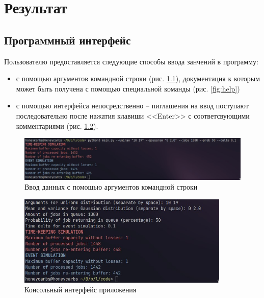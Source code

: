 \chapter{Результат}

%

\section{Программный интерфейс}

Пользователю предоставляется следующие способы ввода занчений в программу:
\begin{itemize}
	\item с помощью аргументов командной строки (рис. \ref{fig:cli}), документация к которым может быть получена с помощью специальной команды (рис. \ref{fig:help})
	\item с помощью интерфейса непосредственно -- пиглашения на ввод поступают последовательно после нажатия клавиши <<Enter>> с соответсвующими комментариями (рис. \ref{fig:ui}).
\end{itemize}

\begin{figure}[H]
	\centering
	\includegraphics[width=\textwidth]{assets/cmdargs.jpg}
	\caption{Ввод данных с помощью аргументов командной строки}
	\label{fig:cli}
\end{figure}

\begin{figure}[H]
	\centering
	\includegraphics[width=0.9\textwidth]{assets/cli.jpg}
	\caption{Консольный интерфейс приложения}
	\label{fig:ui}
\end{figure}

